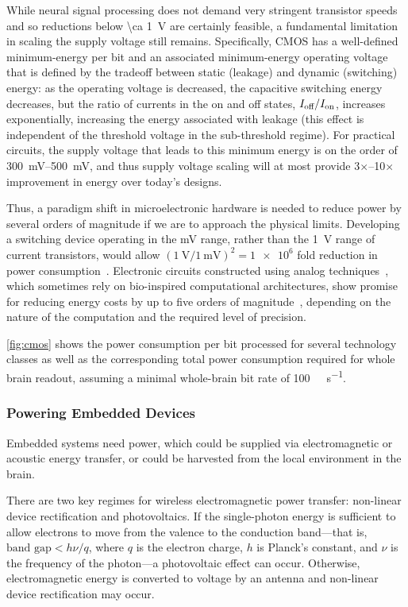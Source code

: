 While neural signal processing does not demand very stringent transistor speeds and so reductions below \SI{\ca 1}{\volt} are certainly feasible, a fundamental limitation in scaling the supply voltage still remains.
Specifically, CMOS has a well-defined minimum-energy per bit and an associated minimum-energy operating voltage that is defined by the tradeoff between static (leakage) and dynamic (switching) energy:
as the operating voltage is decreased, the capacitive switching energy decreases, but the ratio of currents in the on and off states, $I_{\text{\scriptsize off}}/I_{\text{\scriptsize on}}$, increases exponentially, increasing the energy associated with leakage (this effect is independent of the threshold voltage in the sub-threshold regime).
For practical circuits, the supply voltage that leads to this minimum energy is on the order of \SIrange{300}{500}{\milli\volt}, and thus supply voltage scaling will at most provide 3$\times$--10$\times$ improvement in energy over today's designs.

Thus, a paradigm shift in microelectronic hardware is needed to reduce power by several orders of magnitude if we are to approach the physical limits.
Developing a switching device operating in the \si{\milli\volt} range, rather than the \SI{1}{\volt} range of current transistors, would allow $\left(\SI{1}{\volt}/\SI{1}{\milli\volt}\right)^2=\num{1e6}$ fold reduction in power consumption~\cite{yablonovitch08}.
Electronic circuits constructed using analog techniques~\cite{sarpeshkar98}, which sometimes rely on bio-inspired computational architectures, show promise for reducing energy costs by up to five orders of magnitude~\cite{rapoport09,sarpeshkar98,mandal07}, depending on the nature of the computation and the required level of precision.

\autoref{fig:cmos} shows the power consumption per bit processed for several technology classes as well as the corresponding total power consumption required for whole brain readout, assuming a minimal whole-brain bit rate of \SI{100}{\giga\bit\per\second}.

\subsubsection{Powering Embedded Devices}

Embedded systems need power, which could be supplied via electromagnetic or acoustic energy transfer, or could be harvested from the local environment in the brain.

There are two key regimes for wireless electromagnetic power transfer: non-linear device rectification and photovoltaics.
If the single-photon energy is sufficient to allow electrons to move from the valence to the conduction band---that is, $\text{band gap} < h\nu/q$, where $q$ is the electron charge, $h$ is Planck's constant, and $\nu$ is the frequency of the photon---a photovoltaic effect can occur.
Otherwise, electromagnetic energy is converted to voltage by an antenna and non-linear device rectification may occur.

